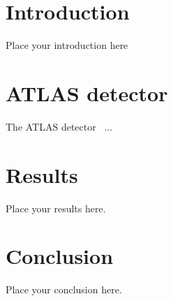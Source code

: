 \documentclass[UKenglish,texlive=2013]{\ATLASLATEXPATH atlasdoc}
\begin{document}
\maketitle

\tableofcontents


\section{Introduction}
\label{sec:intro}

Place your introduction here


\section{ATLAS detector}
\label{sec:detector}

The ATLAS detector~\cite{atlas-detector} ...
% 


\section{Results}
\label{sec:result}

Place your results here.



\section{Conclusion}
\label{sec:conclusion}

Place your conclusion here.


\end{document}
